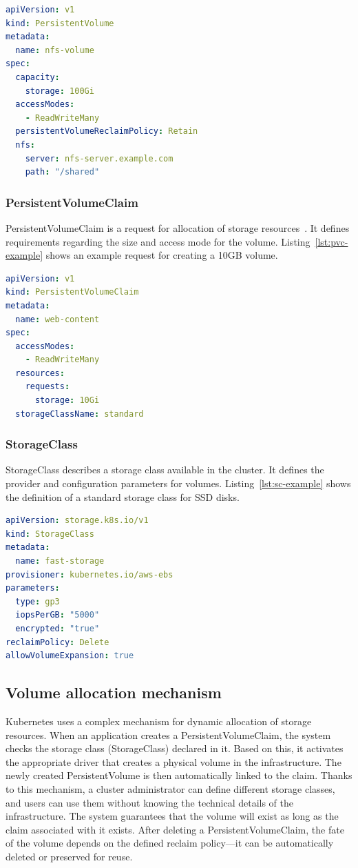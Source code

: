 \begin{lstlisting}[language=yaml,caption={Example PersistentVolume definition},label={lst:pv-example}]
apiVersion: v1
kind: PersistentVolume
metadata:
  name: nfs-volume
spec:
  capacity:
    storage: 100Gi
  accessModes:
    - ReadWriteMany
  persistentVolumeReclaimPolicy: Retain
  nfs:
    server: nfs-server.example.com
    path: "/shared"
\end{lstlisting}

\subsubsection{PersistentVolumeClaim}
PersistentVolumeClaim is a request for allocation of storage resources~\cite{k8s_persistent_volumes}.
It defines requirements regarding the size and access mode for the volume.
Listing~\ref{lst:pvc-example} shows an example request for creating a 10GB volume.

\begin{lstlisting}[language=yaml,caption={Example PersistentVolumeClaim definition},label={lst:pvc-example}]
apiVersion: v1
kind: PersistentVolumeClaim
metadata:
  name: web-content
spec:
  accessModes:
    - ReadWriteMany
  resources:
    requests:
      storage: 10Gi
  storageClassName: standard
\end{lstlisting}

\subsubsection{StorageClass}
StorageClass describes a storage class available in the cluster.
It defines the provider and configuration parameters for volumes.
Listing~\ref{lst:sc-example} shows the definition of a standard storage class for SSD disks.

\begin{lstlisting}[language=yaml,caption={Example StorageClass definition},label={lst:sc-example}]
apiVersion: storage.k8s.io/v1
kind: StorageClass
metadata:
  name: fast-storage
provisioner: kubernetes.io/aws-ebs
parameters:
  type: gp3
  iopsPerGB: "5000"
  encrypted: "true"
reclaimPolicy: Delete
allowVolumeExpansion: true
\end{lstlisting}

\subsection{Volume allocation mechanism}
Kubernetes uses a complex mechanism for dynamic allocation of storage resources.
When an application creates a PersistentVolumeClaim, the system checks the storage class (StorageClass) declared in it.
Based on this, it activates the appropriate driver that creates a physical volume in the infrastructure.
The newly created PersistentVolume is then automatically linked to the claim.
Thanks to this mechanism, a cluster administrator can define different storage classes, and users can use them without knowing the technical details of the infrastructure.
The system guarantees that the volume will exist as long as the claim associated with it exists.
After deleting a PersistentVolumeClaim, the fate of the volume depends on the defined reclaim policy—it can be automatically deleted or preserved for reuse.

